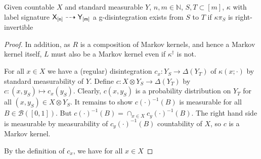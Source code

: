 \begin{theorem}
Given countable $X$ and standard measurable $Y$, $n,m\in\mathbb{N}$, $S,T\subset[m]$, $\kappa$ with label signature $\mathsf{X_{[n]}}\dashrightarrow \mathsf{Y_{[m]}}$ a g-disintegration exists from $S$ to $T$ if $\kappa\pi_S$ is right-invertible 
\end{theorem}

\begin{proof}



In addition, as $R$ is a composition of Markov kernels, and hence a Markov kernel itself, $L$ must also be a Markov kernel even if $\kappa^\dagger$ is not.

For all $x\in X$ we have a (regular) disintegration $c_x:Y_S\to \Delta(Y_T)$ of $\kappa(x;\cdot)$ by standard measurability of $Y$. Define $c:X\otimes Y_S\to \Delta(Y_T)$ by $c:(x,y_S)\mapsto c_x(y_S)$. Clearly, $c(x,y_S)$ is a probability distribution on $Y_T$ for all $(x,y_S)\in X\otimes Y_S$. It remains to show $c(\cdot)^{-1}(B)$ is measurable for all $B\in \mathcal{B}([0,1])$. But $c(\cdot)^{-1}(B) = \cap_{x\in X} c_y(\cdot)^{-1}(B)$. The right hand side is measurable by measurability of $c_y(\cdot)^{-1}(B)$ countability of $X$, so $c$ is a Markov kernel. 

By the definition of $c_x$, we have for all $x\in X$


\end{proof}
